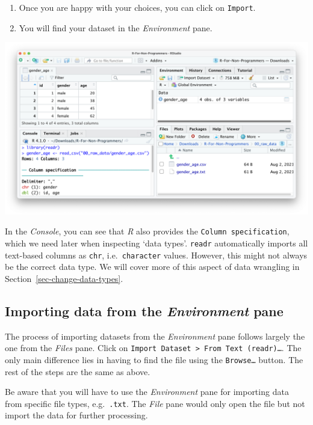 \documentclass[
  letterpaper,
  DIV=11,
  numbers=noendperiod]{scrreprt}
\begin{document}
\begin{enumerate}
\def\labelenumi{\arabic{enumi}.}
\setcounter{enumi}{4}
\item
  Once you are happy with your choices, you can click on
  \texttt{Import}.
\item
  You will find your dataset in the \emph{Environment} pane.
\end{enumerate}

\includegraphics{images/chapter_07_img/01_files_pane_import/04_files_pane_import.png}

In the \emph{Console}, you can see that \emph{R} also provides the
\texttt{Column\ specification}, which we need later when inspecting
`data types'. \texttt{readr} automatically imports all text-based
columns as \texttt{chr}, i.e.~\texttt{character} values. However, this
might not always be the correct data type. We will cover more of this
aspect of data wrangling in Section~\ref{sec-change-data-types}.

\subsection{\texorpdfstring{Importing data from the \emph{Environment}
pane}{Importing data from the Environment pane}}\label{sec-importing-data-from-the-environment-pane}

The process of importing datasets from the \emph{Environment} pane
follows largely the one from the \emph{Files} pane. Click on
\texttt{Import\ Dataset\ \textgreater{}\ From\ Text\ (readr)…}. The only
main difference lies in having to find the file using the
\texttt{Browse…} button. The rest of the steps are the same as above.

Be aware that you will have to use the \emph{Environment} pane for
importing data from specific file types, e.g.~\texttt{.txt}. The
\emph{File} pane would only open the file but not import the data for
further processing.
\end{document}
